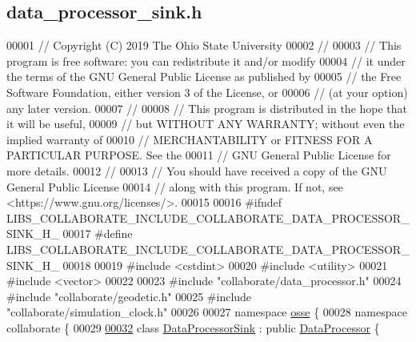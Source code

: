 \hypertarget{data__processor__sink_8h_source}{}\subsection{data\+\_\+processor\+\_\+sink.\+h}
\label{data__processor__sink_8h_source}

\begin{DoxyCode}
00001 \textcolor{comment}{// Copyright (C) 2019 The Ohio State University}
00002 \textcolor{comment}{//}
00003 \textcolor{comment}{// This program is free software: you can redistribute it and/or modify}
00004 \textcolor{comment}{// it under the terms of the GNU General Public License as published by}
00005 \textcolor{comment}{// the Free Software Foundation, either version 3 of the License, or}
00006 \textcolor{comment}{// (at your option) any later version.}
00007 \textcolor{comment}{//}
00008 \textcolor{comment}{// This program is distributed in the hope that it will be useful,}
00009 \textcolor{comment}{// but WITHOUT ANY WARRANTY; without even the implied warranty of}
00010 \textcolor{comment}{// MERCHANTABILITY or FITNESS FOR A PARTICULAR PURPOSE.  See the}
00011 \textcolor{comment}{// GNU General Public License for more details.}
00012 \textcolor{comment}{//}
00013 \textcolor{comment}{// You should have received a copy of the GNU General Public License}
00014 \textcolor{comment}{// along with this program.  If not, see <https://www.gnu.org/licenses/>.}
00015 
00016 \textcolor{preprocessor}{#ifndef LIBS\_COLLABORATE\_INCLUDE\_COLLABORATE\_DATA\_PROCESSOR\_SINK\_H\_}
00017 \textcolor{preprocessor}{#define LIBS\_COLLABORATE\_INCLUDE\_COLLABORATE\_DATA\_PROCESSOR\_SINK\_H\_}
00018 
00019 \textcolor{preprocessor}{#include <cstdint>}
00020 \textcolor{preprocessor}{#include <utility>}
00021 \textcolor{preprocessor}{#include <vector>}
00022 
00023 \textcolor{preprocessor}{#include "collaborate/data\_processor.h"}
00024 \textcolor{preprocessor}{#include "collaborate/geodetic.h"}
00025 \textcolor{preprocessor}{#include "collaborate/simulation\_clock.h"}
00026 
00027 \textcolor{keyword}{namespace }\hyperlink{namespaceosse}{osse} \{
00028 \textcolor{keyword}{namespace }collaborate \{
00029 
\hyperlink{classosse_1_1collaborate_1_1_data_processor_sink}{00032} \textcolor{keyword}{class }\hyperlink{classosse_1_1collaborate_1_1_data_processor_sink}{DataProcessorSink} : \textcolor{keyword}{public} \hyperlink{classosse_1_1collaborate_1_1_data_processor}{DataProcessor} \{

\end{DoxyCode}
